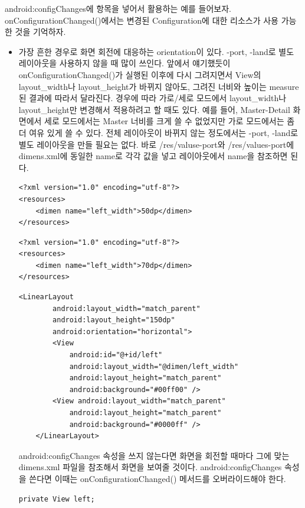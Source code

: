 android:configChanges에 항목을 넣어서 활용하는 예를 들어보자. 
onConfigurationChanged()에서는 변경된 Configuration에 대한 리소스가 사용 가능한 것을 기억하자. 
\begin{itemize}
\item 가장 흔한 경우로 화면 회전에 대응하는 orientation이 있다. -port, -land로 별도 레이아웃을 사용하지 않을 때 많이 쓰인다. 
앞에서 얘기했듯이 onConfigurationChanged()가 실행된 이후에 다시 그려지면서 View의 layout\_width나 layout\_height가 바뀌지 않아도, 그려진 너비와 높이는 measure된 결과에 따라서 달라진다.
경우에 따라 가로/세로 모드에서 layout\_width나 layout\_height만 변경해서 적용하려고 할 때도 있다. 
예를 들어, Master-Detail 화면에서 세로 모드에서는 Master 너비를 크게 쓸 수 없었지만 가로 모드에서는 좀 더 여유 있게 쓸 수 있다. 
전체 레이아웃이 바뀌지 않는 정도에서는 -port, -land로 별도 레이아웃을 만들 필요는 없다.
바로 /res/valuse-port와 /res/values-port에 dimens.xml에 동일한 name로 각각 값을 넣고 레이아웃에서 name을 참조하면 된다.
\begin{lstlisting}[frame=single, caption=/res/values-port/dimens.xml]
<?xml version="1.0" encoding="utf-8"?>
<resources>
	<dimen name="left_width">50dp</dimen>
</resources>
\end{lstlisting}

\begin{lstlisting}[frame=single, caption=/res/values-land/dimens.xml]
<?xml version="1.0" encoding="utf-8"?>
<resources>
	<dimen name="left_width">70dp</dimen>
</resources>
\end{lstlisting}

\begin{lstlisting}[frame=single, caption=/res/layout/view\_list.xml 일부분]
	<LinearLayout
		android:layout_width="match_parent"
		android:layout_height="150dp"
		android:orientation="horizontal">
		<View
			android:id="@+id/left"
			android:layout_width="@dimen/left_width"
			android:layout_height="match_parent"
			android:background="#00ff00" />
		<View android:layout_width="match_parent"
			android:layout_height="match_parent"
			android:background="#0000ff" />
	</LinearLayout>		
\end{lstlisting}
android:configChanges 속성을 쓰지 않는다면 화면을 회전할 때마다 그에 맞는 dimens.xml 파일을 참조해서 화면을 보여줄 것이다. 
android:configChanges 속성을 쓴다면 이때는 onConfigurationChanged() 메서드를 오버라이드해야 한다.

\begin{lstlisting}[frame=single]
	private View left;


\end{lstlisting}
\end{itemize}
